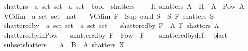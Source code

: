 \begin{isabellebody}
\ shatters\ {\isacharcolon}{\kern0pt}{\isacharcolon}{\kern0pt}\ {\isachardoublequoteopen}{\isacharprime}{\kern0pt}a\ set\ set\ {\isasymRightarrow}\ {\isacharprime}{\kern0pt}a\ set\ {\isasymRightarrow}\ bool{\isachardoublequoteclose}\ {\isacharparenleft}{\kern0pt}\ {\isachardoublequoteopen}shatters{\isachardoublequoteclose}\ {}{}{\isacharparenright}{\kern0pt}\isanewline
\ \ \ {\isachardoublequoteopen}H\ shatters\ A\ {\isasymequiv}\ H\ {\isasyminter}{\isacharasterisk}{\kern0pt}\ A\ {\isacharequal}{\kern0pt}\ Pow\ A{\isachardoublequoteclose}\isanewline
\isanewline
{}\isamarkupfalse%
\ VC{\isacharunderscore}{\kern0pt}dim\ {\isacharcolon}{\kern0pt}{\isacharcolon}{\kern0pt}\ {\isachardoublequoteopen}{\isacharprime}{\kern0pt}a\ set\ set\ {\isasymRightarrow}\ nat{\isachardoublequoteclose}\isanewline
\ \ \ {\isachardoublequoteopen}VC{\isacharunderscore}{\kern0pt}dim\ F\ {\isacharequal}{\kern0pt}\ Sup\ {\isacharbraceleft}{\kern0pt}card\ S\ {\isacharbar}{\kern0pt}\ S{\isachardot}{\kern0pt}\ F\ shatters\ S{\isacharbraceright}{\kern0pt}{\isachardoublequoteclose}\isanewline
\isanewline
{}\isamarkupfalse%
\ shattered{\isacharunderscore}{\kern0pt}by\ {\isacharcolon}{\kern0pt}{\isacharcolon}{\kern0pt}\ {\isachardoublequoteopen}{\isacharprime}{\kern0pt}a\ set\ set\ {\isasymRightarrow}\ {\isacharprime}{\kern0pt}a\ set\ set{\isachardoublequoteclose}\isanewline
\ \ \ {\isachardoublequoteopen}shattered{\isacharunderscore}{\kern0pt}by\ F\ {\isasymequiv}\ {\isacharbraceleft}{\kern0pt}A{\isachardot}{\kern0pt}\ F\ shatters\ A{\isacharbraceright}{\kern0pt}{\isachardoublequoteclose}\isanewline
\isanewline
{}\isamarkupfalse%
\ shattered{\isacharunderscore}{\kern0pt}by{\isacharunderscore}{\kern0pt}in{\isacharunderscore}{\kern0pt}Pow{\isacharcolon}{\kern0pt}\isanewline
\ \ \ {\isachardoublequoteopen}shattered{\isacharunderscore}{\kern0pt}by\ F\ {\isasymsubseteq}\ Pow\ {\isacharparenleft}{\kern0pt}{\isasymUnion}\ F{\isacharparenright}{\kern0pt}{\isachardoublequoteclose}\isanewline
%
\isadelimproof
\ \ %
\endisadelimproof
%
\isatagproof
{}\isamarkupfalse%
\ shattered{\isacharunderscore}{\kern0pt}by{\isacharunderscore}{\kern0pt}def\ \isamarkupfalse%
\ blast%
\endisatagproof
{\isafoldproof}%
%
\isadelimproof
\isanewline
%
\endisadelimproof
\isanewline
{}\isamarkupfalse%
\ subset{\isacharunderscore}{\kern0pt}shatters{\isacharcolon}{\kern0pt}\isanewline
\ \ \ {\isachardoublequoteopen}A\ {\isasymsubseteq}\ B{\isachardoublequoteclose}\ \ {\isachardoublequoteopen}A\ shatters\ X{\isachardoublequoteclose}\isanewline

\end{isabellebody}
